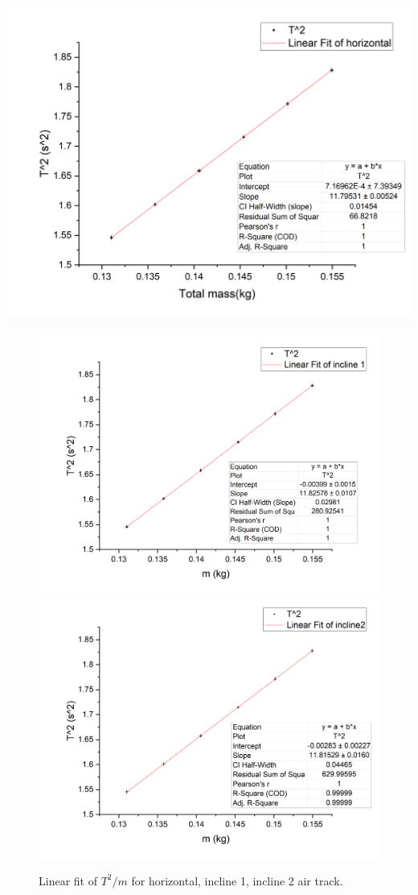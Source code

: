 \documentclass[11pt,a4paper]{article}
\begin{document}
\begin{center}
    \includegraphics[scale=0.4]{horizontal.png}

    \begin{figure}[H]
            \includegraphics[scale=0.35]{incline1.png}
    \includegraphics[scale=0.35]{incline2.png}
    \caption{Linear fit of $T^2/m$ for horizontal, incline 1, incline 2 air track.}
    \label{tmfigure}
    \end{figure}
\end{center}
\end{document}
